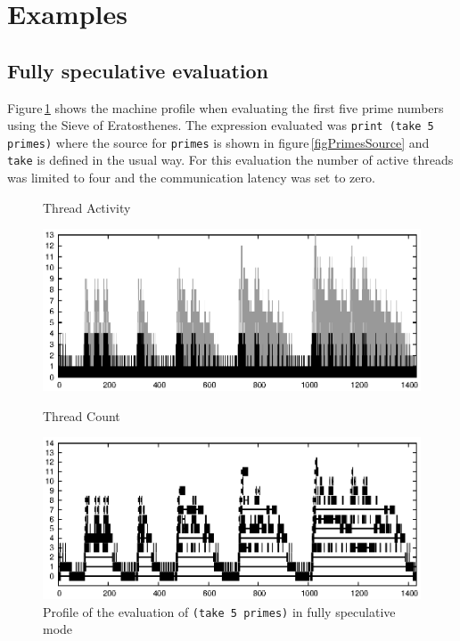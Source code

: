 \documentclass{llncs}
\begin{document}
\section{Examples}

\subsection{Fully speculative evaluation}

Figure\,\ref{figPrimesProfile} shows the machine profile when evaluating the first five prime numbers using the Sieve of Eratosthenes. The expression evaluated was \texttt{print (take 5 primes)} where the source for \texttt{primes} is shown in figure\,\ref{figPrimesSource} and \texttt{take} is defined in the usual way. For this evaluation the number of active threads was limited to four and the communication latency was set to zero.


\begin{figure}

Thread Activity

\noindent
\includegraphics[width=12cm]{image/primes5_fullspec-threads.eps}

Thread Count

\noindent
\includegraphics[width=12cm]{image/primes5_fullspec-activity.eps}

\caption{Profile of the evaluation of \texttt{(take 5 primes)} in fully speculative mode}
\label{figPrimesProfile}
\end{figure}
\end{document}
